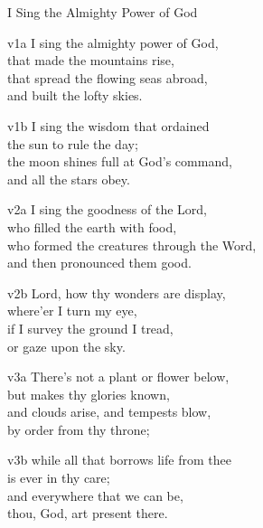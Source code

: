 \begin{song}{I Sing the Almighty Power of God}

    \begin{songframe}{v1a}
        I sing the almighty power of God, \\
        that made the mountains rise, \\
        that spread the flowing seas abroad, \\
        and built the lofty skies.
    \end{songframe}
       
    \begin{songframe}{v1b}
        I sing the wisdom that ordained \\
        the sun to rule the day; \\
        the moon shines full at God's command, \\
        and all the stars obey.
    \end{songframe}

    \begin{songframe}{v2a}
        I sing the goodness of the Lord, \\
        who filled the earth with food, \\
        who formed the creatures through the Word, \\
        and then pronounced them good.
    \end{songframe}

    \begin{songframe}{v2b}
        Lord, how thy wonders are display, \\
        where'er I turn my eye, \\
        if I survey the ground I tread, \\
        or gaze upon the sky.
    \end{songframe}

    \begin{songframe}{v3a}
        There's not a plant or flower below, \\
        but makes thy glories known, \\
        and clouds arise, and tempests blow, \\
        by order from thy throne;
    \end{songframe}

    \begin{songframe}{v3b}
        while all that borrows life from thee \\
        is ever in thy care; \\
        and everywhere that we can be, \\
        thou, God, art present there.
    \end{songframe}


\end{song}
\endinput
